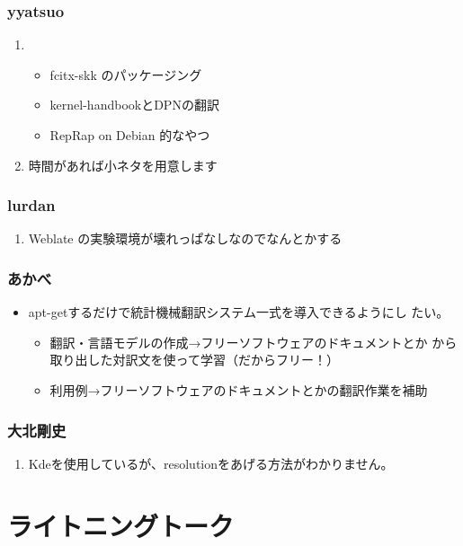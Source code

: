 \documentclass[cjk,dvipdfmx,10pt,compress,%
hyperref={bookmarks=true,bookmarksnumbered=true,bookmarksopen=false,%
colorlinks=false,%
pdftitle={第 80 回 関西 Debian 勉強会},%
pdfauthor={倉敷・のがた・佐々木・かわだ・八津尾},%
pdfsubject={資料},%
}]{beamer}
\begin{document}
\begin{frame}
  \frametitle{ yyatsuo }
  \begin{enumerate}
  \item 
    \begin{itemize}
    \item fcitx-skk のパッケージング
    \item kernel-handbookとDPNの翻訳
    \item RepRap on Debian 的なやつ
    \end{itemize}
  \item 時間があれば小ネタを用意します
  \end{enumerate}
\end{frame}

\begin{frame}
  \frametitle{ lurdan }
  \begin{enumerate}
  \item Weblate の実験環境が壊れっぱなしなのでなんとかする
  \end{enumerate}
\end{frame}

\begin{frame}
  \frametitle{ あかべ }
  \begin{itemize}
  \item apt-getするだけで統計機械翻訳システム一式を導入できるようにし
    たい。
    \begin{itemize}
    \item 翻訳・言語モデルの作成→フリーソフトウェアのドキュメントとか
      から取り出した対訳文を使って学習（だからフリー！）
    \item 利用例→フリーソフトウェアのドキュメントとかの翻訳作業を補助
    \end{itemize}
  \end{itemize}
\end{frame}

\begin{frame}
  \frametitle{ 大北剛史 }
  \begin{enumerate}
  \item Kdeを使用しているが、resolutionをあげる方法がわかりません。
  \end{enumerate}
\end{frame}


\section{ライトニングトーク}
\end{document}
